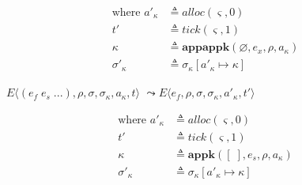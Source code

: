 \documentclass[12pt,draft]{article}
\begin{document}
\begin{multicols*}{2}
\vspace{-7mm}
\begin{align*}
  \text{where }
  a'_\kappa &\triangleq alloc(\varsigma, 0) \\
  t' &\triangleq tick(\varsigma, 1) \\
  \kappa &\triangleq \textbf{appappk}(\varnothing, e_x, \rho, a_\kappa) \\
  \sigma'_\kappa &\triangleq \sigma_\kappa[a'_\kappa \mapsto \kappa]
\end{align*}
\begin{center}
  $E\langle (e_f\;e_s\;...) , \rho , \sigma , \sigma_\kappa , a_\kappa , t \rangle$
  $\leadsto E\langle e_f , \rho , \sigma , \sigma_\kappa , a'_\kappa , t' \rangle$
\end{center}
\vspace{-5mm}
\begin{align*}
  \text{where }
  a'_\kappa &\triangleq alloc(\varsigma, 0) \\
  t' &\triangleq tick(\varsigma, 1) \\
  \kappa &\triangleq \textbf{appk}([\;], e_s, \rho, a_\kappa) \\
  \sigma'_\kappa &\triangleq \sigma_\kappa[a'_\kappa \mapsto \kappa]
\end{align*}
\end{multicols*}



\newpage
\end{document}
